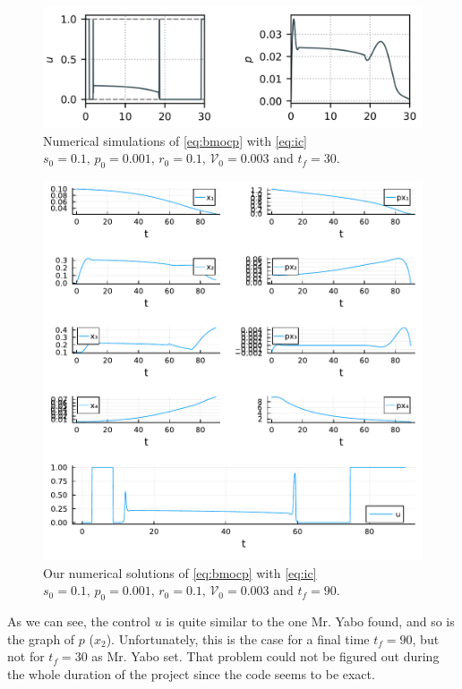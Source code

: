 \documentclass{tudelft-report}
\begin{document}
\begin{figure}[H]
    \centering
    \includegraphics[width=\textwidth]{figures/control.png}
    \caption*{Numerical simulations of \eqref{eq:bmocp} with \eqref{eq:ic} $s_0 = 0.1,\, p_0 = 0.001,\, r_0=0.1,\, \mathcal{V}_0 = 0.003 $ and $t_f=30$.}
    \label{fig:control1}
\end{figure}
\begin{figure}[H]
\centering
\includegraphics[width=\textwidth]{figures/tf_90.pdf}
\caption*{Our numerical solutions of \eqref{eq:bmocp} with \eqref{eq:ic} $s_0 = 0.1,\, p_0 = 0.001,\, r_0=0.1,\, \mathcal{V}_0 = 0.003 $ and $t_f=90$.}
\end{figure}
As we can see, the control $u$ is quite similar to the one Mr. Yabo found, and so is the graph of $p$ ($x_2$). Unfortunately, this is the case for a final time $t_f=90$, but not for $t_f=30$ as Mr. Yabo set. That problem could not be figured out during the whole duration of the project since the code seems to be exact.
\end{document}
